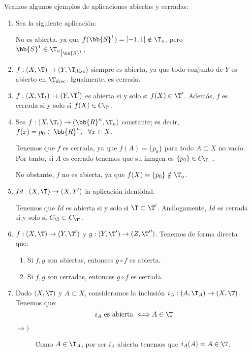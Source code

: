 \begin{ejemplo} Veamos algunos ejemplos de aplicaciones abiertas y cerradas:
\begin{enumerate}
    \item Sea la siguiente aplicación:

    No es abierta, ya que $f(\bb{S}^1)=[-1,1]\notin \T_u$, pero $\bb{S}^1\in {\T_u}_{\big| \bb{S}^1}$.


    \item $f:(X,\T)\to (Y,\T_{disc})$ siempre es abierta, ya que todo conjunto de $Y$ es abierto en $\T_{disc}$. Igualmente, es cerrada.

    \item $f:(X,\T_t)\to (Y,\T')$ es abierta si y solo si $f(X)\in \T'$. Además, $f$ es cerrada si y solo si $f(X)\in C_{\T'}$.

    \item Sea $f:(X,\T_t)\to (\bb{R}^n,\T_u)$ constante; es decir, $f(x)=p_0\in \bb{R}^n,~~\forall x\in X$.

    Tenemos que $f$ es cerrada, ya que $f(A)=\{p_0\}$ para todo $A\subset X$ no vacío. Por tanto, si $A$ es cerrado tenemos que su imagen es $\{p_0\}\in C_{\T_u}$.

    No obstante, $f$ no es abierta, ya que $f(X)=\{p_0\}\notin \T_u$.

    \item $Id:(X,\T)\to (X,T')$ la aplicación identidad. 
    
    Tenemos que $Id$ es abierta si y solo si $\T\subset \T'$. Análogamente, $Id$ es cerrada si y solo si $C_\T\subset C_{\T'}$.

    \item $f:(X,\T)\to (Y,\T')$ y $g:(Y,\T')\to (Z,\T'')$. Tenemos de forma directa que:
    \begin{enumerate}
        \item Si $f,g$ son abiertas, entonces $g\circ f$ es abierta.
        \item Si $f,g$ son cerradas, entonces $g\circ f$ es cerrada.
    \end{enumerate}


    \item Dado $(X,\T)$ y $A\subset X$, consideramos la inclusión $i_A:(A,\T_A)\to (X,\T)$. Tenemos que:
    \begin{equation*}
        i_A \text{ es abierta }\Longleftrightarrow A\in \T
    \end{equation*}
    \begin{description}
        \item[$\Longrightarrow)$] Como $A\in \T_A$, por ser $i_A$ abierta tenemos que $i_A(A)=A\in \T$.


\end{description}
\end{enumerate}
\end{ejemplo}
